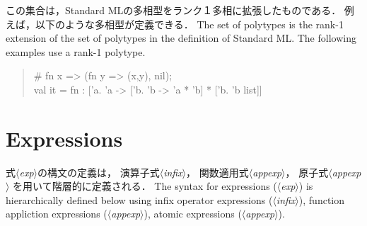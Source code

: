 \documentclass{jbook}
\newcommand{\txt}[2]{#2}
\newcommand{\nonterm}[1]{\mbox{$\langle$}{\it #1}\mbox{$\rangle$}}
\newenvironment{program}{\begin{quote}\begin{tt}}%
                        {\end{tt}\end{quote}}
\begin{document}
\ifjp%
	この集合は，Standard MLの多相型をランク１多相に拡張したものである．
	例えば，以下のような多相型が定義できる．
\else%
	The set of polytypes is the rank-1 extension of the set of
polytypes in the definition of Standard ML.
	The following examples use a rank-1 polytype.
\fi%
\begin{program}
\# fn x => (fn y => (x,y), nil);\\
val it = fn : ['a. 'a -> ['b. 'b -> 'a * 'b] * ['b. 'b list]]
\end{program}

\chapter{\txt{式}{Expressions}}
\label{sec:expSyntax}
\ifjp%
	式\nonterm{exp}の構文の定義は，
演算子式\nonterm{infix}，
関数適用式\nonterm{appexp}，
原子式\nonterm{appexp}
を用いて階層的に定義される．
\else%
	The syntax for expressions (\nonterm{exp}) is hierarchically
defined below using infix operator expressions (\nonterm{infix}), 
function appliction expressions (\nonterm{appexp}), 
atomic expressions (\nonterm{appexp}).
\fi%

\bigskip
\end{document}
